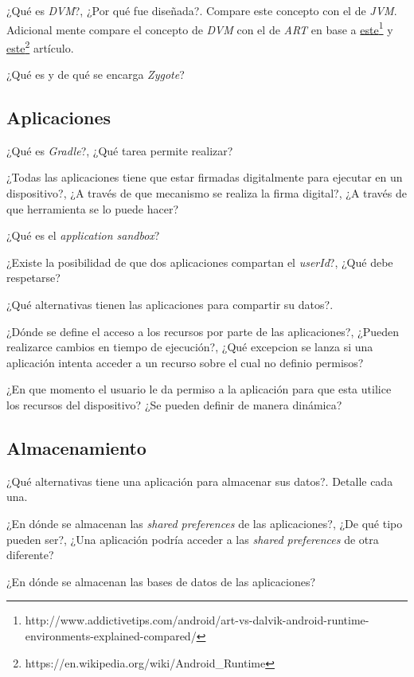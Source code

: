 \begin{questions}
  \question ¿Qué es \textit{DVM}?, ¿Por qué fue diseñada?. Compare este concepto con el de \textit{JVM}. Adicional mente compare el concepto de \textit{DVM} con el de \textit{ART} en base a \href{http://www.addictivetips.com/android/art-vs-dalvik-android-runtime-environments-explained-compared/}{este}\footnote{http://www.addictivetips.com/android/art-vs-dalvik-android-runtime-environments-explained-compared/} y \href{https://en.wikipedia.org/wiki/Android\_Runtime}{este}\footnote{https://en.wikipedia.org/wiki/Android\_Runtime} artículo.

  \question ¿Qué es y de qué se encarga \textit{Zygote}?
\end{questions}

\subsection{Aplicaciones}
\begin{questions}
  \question ¿Qué es \textit{Gradle}?, ¿Qué tarea permite realizar?
  
  \question ¿Todas las aplicaciones tiene que estar firmadas digitalmente para ejecutar en un dispositivo?, ¿A través de que mecanismo se realiza la firma digital?, ¿A través de que herramienta se lo puede hacer?
  
  \question ¿Qué es el \textit{application sandbox}?
  
  \question ¿Existe la posibilidad de que dos aplicaciones compartan el \textit{userId}?, ¿Qué debe respetarse?
  
  \question ¿Qué alternativas tienen las aplicaciones para compartir su datos?.
  
  \question ¿Dónde se define el acceso a los recursos por parte de las aplicaciones?, ¿Pueden realizarce cambios en tiempo de ejecución?, ¿Qué excepcion se lanza si una aplicación intenta acceder a un recurso sobre el cual no definio permisos?
  
  \question ¿En que momento el usuario le da permiso a la aplicación para que esta utilice los recursos del dispositivo? ¿Se pueden definir de manera dinámica?
\end{questions}

\subsection{Almacenamiento}
\begin{questions}
  \question ¿Qué alternativas tiene una aplicación para almacenar sus datos?. Detalle cada una.

  \question ¿En dónde se almacenan las \textit{shared preferences} de las aplicaciones?, ¿De qué tipo pueden ser?, ¿Una aplicación podría acceder a las \textit{shared preferences} de otra diferente?
  
  \question ¿En dónde se almacenan las bases de datos de las aplicaciones?
\end{questions}

